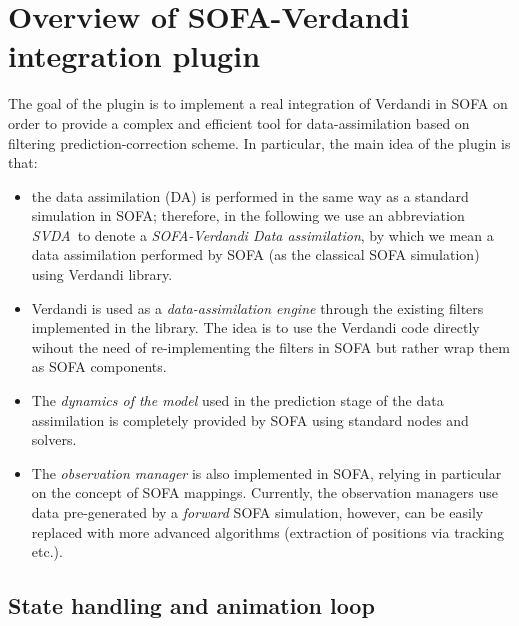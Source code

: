 \documentclass[10pt]{article}
\def\svda{\textit{SVDA}}
\begin{document}
\section{Overview of SOFA-Verdandi integration plugin}
\label{s:overview}
The goal of the plugin is to implement a real integration of Verdandi in SOFA on order to provide a complex and efficient tool for data-assimilation based on filtering 
prediction-correction scheme.
In particular, the main idea of the plugin is that:
\begin{itemize}
\item the data assimilation (DA) is performed in the same way as a standard simulation in SOFA; therefore, in the following we use an abbreviation \svda\ to denote a \emph{SOFA-Verdandi Data assimilation}, 
by which we mean a data assimilation performed by SOFA (as the classical SOFA simulation) using Verdandi library.
\item Verdandi is used as a \emph{data-assimilation engine} through the existing filters implemented in the library. The idea is to use the Verdandi code directly wihout the need of re-implementing the filters in SOFA but rather wrap them as SOFA components.
\item The \emph{dynamics of the model} used in the prediction stage of the data assimilation is completely provided by SOFA using standard nodes and solvers. 
\item The \emph{observation manager} is also implemented in SOFA, relying in particular on the concept of SOFA mappings. Currently, the observation managers use data pre-generated by a \emph{forward} SOFA simulation, however, can be easily replaced with more advanced algorithms (extraction of positions via tracking etc.).
\end{itemize}

\subsection{State handling and animation loop}
\end{document}
